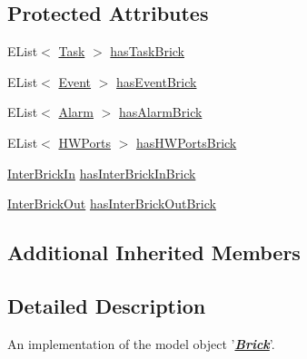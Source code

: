\subsection*{Protected Attributes}
\begin{DoxyCompactItemize}
\item 
E\-List$<$ \hyperlink{interfaceshootingmachineemfmodel_1_1_task}{Task} $>$ \hyperlink{classshootingmachineemfmodel_1_1impl_1_1_brick_impl_ad74e2edddf418ebc84b4b86103c990f7}{has\-Task\-Brick}
\item 
E\-List$<$ \hyperlink{interfaceshootingmachineemfmodel_1_1_event}{Event} $>$ \hyperlink{classshootingmachineemfmodel_1_1impl_1_1_brick_impl_a82cd434d746a251a4cabe6d97f7b90d2}{has\-Event\-Brick}
\item 
E\-List$<$ \hyperlink{interfaceshootingmachineemfmodel_1_1_alarm}{Alarm} $>$ \hyperlink{classshootingmachineemfmodel_1_1impl_1_1_brick_impl_a158f1f9b48ea9f93fdb6d4b6a9162ca3}{has\-Alarm\-Brick}
\item 
E\-List$<$ \hyperlink{interfaceshootingmachineemfmodel_1_1_h_w_ports}{H\-W\-Ports} $>$ \hyperlink{classshootingmachineemfmodel_1_1impl_1_1_brick_impl_abec72f296d414bf500aa27132358c6ef}{has\-H\-W\-Ports\-Brick}
\item 
\hyperlink{interfaceshootingmachineemfmodel_1_1_inter_brick_in}{Inter\-Brick\-In} \hyperlink{classshootingmachineemfmodel_1_1impl_1_1_brick_impl_ad37bf6ab0aa3031e9a4d46abb9aa3329}{has\-Inter\-Brick\-In\-Brick}
\item 
\hyperlink{interfaceshootingmachineemfmodel_1_1_inter_brick_out}{Inter\-Brick\-Out} \hyperlink{classshootingmachineemfmodel_1_1impl_1_1_brick_impl_a6840d2c02a6b95ce3f4c10093a40441d}{has\-Inter\-Brick\-Out\-Brick}
\end{DoxyCompactItemize}
\subsection*{Additional Inherited Members}


\subsection{Detailed Description}
An implementation of the model object '{\itshape {\bfseries \hyperlink{interfaceshootingmachineemfmodel_1_1_brick}{Brick}}}'.

